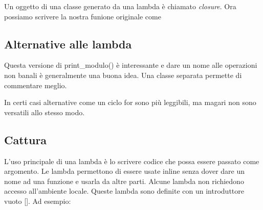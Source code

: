 \documentclass[11pt,a4paper]{book}
\begin{document}
Un oggetto di una classe generato da una lambda è chiamato \textit{closure}. Ora possiamo scrivere la nostra funione originale come
\label{code: 175}

\subsection{Alternative alle lambda}
Questa versione di print\_modulo() è interessante e dare un nome alle operazioni non banali è generalmente una buona idea. Una classe separata permette di commentare meglio.

In certi casi alternative come un ciclo for sono più leggibili, ma magari non sono versatili allo stesso modo.

\subsection{Cattura}
L'uso principale di una lambda è lo scrivere codice che possa essere passato come argomento. Le lambda permettono di essere usate inline senza dover dare un nome ad una funzione e usarla da altre parti. Alcune lambda non richiedono accesso all'ambiente locale. Queste lambda sono definite con un introduttore vuoto []. Ad esempio:
\label{code: 176}
\end{document}

